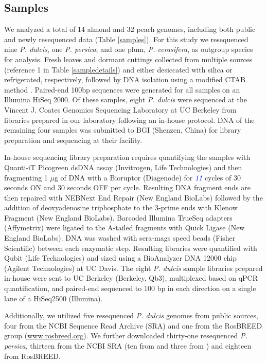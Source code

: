 \documentclass[12pt]{article}
\newcommand{\jri}[1]{\textcolor{red}{\emph{#1}}}
\newcommand{\dv}[1]{\textcolor{blue}{\emph{#1}}}
\begin{document}
\subsection*{Samples}
We analyzed a total of 14 almond and 32 peach genomes, including both public and newly resequenced data (Table \ref{samples}). 
%
For this study we resequenced nine \emph{P. dulcis}, one \emph{P. persica}, and one plum, \emph{P. cerasifera}, as outgroup species for analysis.
%
Fresh leaves and dormant cuttings collected from multiple sources (reference 1 in Table \ref{sampledetails}) and either desiccated with silica or refrigerated, respectively, followed by DNA isolation using a modified CTAB method \citep{doyle1987rapid}.
%
Paired-end 100bp sequences were generated for all samples on an Illumina HiSeq 2000. 
%
Of these samples, eight \emph{P. dulcis} were sequenced at the Vincent J. Coates Genomics Sequencing Laboratory at UC Berkeley from libraries prepared in our laboratory following an in-house protocol. 
DNA of the remaining four samples was submitted to BGI (Shenzen, China) for library preparation and sequencing at their facility.

In-house sequencing library preparation requires quantifying the samples with Quanti-iT Picogreen dsDNA assay (Invitrogen, Life Technologies) and then fragmenting 1 $\mu$g of DNA with a Bioruptor (Diagenode) for \dv{11} cycles of 30 seconds ON and 30 seconds OFF per cycle. 
%
Resulting DNA fragment ends are then repaired with NEBNext End Repair (New England BioLabs) followed by the addition of deoxyadenosine triphosphate to the 3-prime ends with Klenow Fragment (New England BioLabs). 
%
Barcoded Illumina TrueSeq adapters (Affymetrix) were ligated to the A-tailed fragments with Quick Ligase (New England BioLabs). 
%
DNA was washed with sera-mags speed beads (Fisher Scientific) between each enzymatic step.  
%
Resulting libraries were quantified with Qubit (Life Technologies) and sized using a  BioAnalyzer DNA 12000 chip (Agilent Technologies) at UC Davis. 
%
The eight \emph{P. dulcis} sample libraries prepared in-house were sent to UC Berkeley (Berkeley, Qb3), multiplexed based on qPCR quantification, and paired-end sequenced to 100 bp in each direction on a single lane of a HiSeq2500 (Illumina).

Additionally, we utilized five resequenced \emph{P. dulcis} genomes from public sources, four from \citealt{koepke2013comparative} %
the NCBI Sequence Read Archive (SRA) and one from the RosBREED group (\url{www.rosbreed.org}). 
%
We further downloaded thirty-one resequenced \emph{P. persica}, thirteen from the NCBI SRA (ten from \citealp{verde2013high} and three from \citealp{ahmad2011whole}) and eighteen from RosBREED.
%
%
\end{document}
